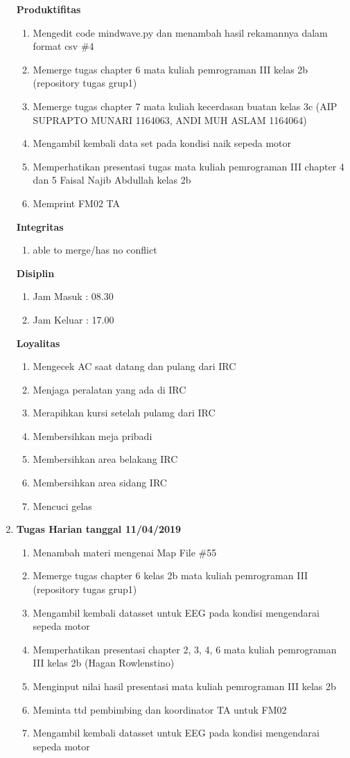 \begin{enumerate}
\textbf{Produktifitas}
\begin{enumerate}
\item Mengedit code mindwave.py dan menambah hasil rekamannya dalam format csv \#4
\item Memerge tugas chapter 6 mata kuliah pemrograman III kelas 2b (repository tugas grup1)
\item Memerge tugas chapter 7 mata kuliah kecerdasan buatan kelas 3c  (AIP SUPRAPTO MUNARI 1164063, ANDI MUH ASLAM 1164064)
\item Mengambil kembali data set pada kondisi naik sepeda motor
\item Memperhatikan presentasi tugas mata kuliah pemrograman III chapter 4 dan 5 Faisal Najib Abdullah kelas 2b
\item Memprint FM02 TA
\end{enumerate}

\textbf{Integritas}
\begin{enumerate}
\item able to merge/has no conflict
\end{enumerate}

\textbf{Disiplin}
\begin{enumerate}
\item Jam Masuk : 08.30
\item Jam Keluar : 17.00
\end{enumerate}

\textbf{Loyalitas}
\begin{enumerate}
\item Mengecek AC saat datang dan pulang dari IRC
\item Menjaga peralatan yang ada di IRC
\item Merapihkan kursi setelah pulamg dari IRC
\item Membersihkan meja pribadi
\item Membersihkan area belakang IRC
\item Membersihkan area sidang IRC
\item Mencuci gelas
\end{enumerate}

\item \textbf{Tugas Harian tanggal 11/04/2019}
\begin{enumerate}
\item Menambah materi mengenai Map File \#55
\item Memerge tugas chapter 6 kelas 2b mata kuliah pemrograman III (repository tugas grup1)
\item Mengambil kembali datasset untuk EEG pada kondisi mengendarai sepeda motor
\item Memperhatikan presentasi chapter 2, 3, 4, 6 mata kuliah pemrograman III kelas 2b (Hagan Rowlenstino)
\item Menginput nilai hasil presentasi mata kuliah pemrograman III kelas 2b
\item Meminta ttd pembimbing dan koordinator TA untuk FM02 
\item Mengambil kembali datasset untuk EEG pada kondisi mengendarai sepeda motor
\end{enumerate}


\end{enumerate}
